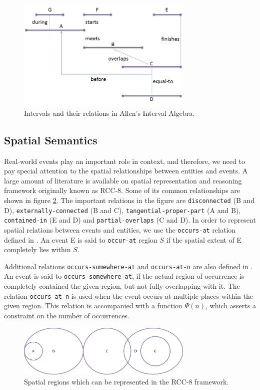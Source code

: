 \begin{figure}[t]
\centering
\includegraphics[width=0.75\textwidth]{media/chapter2/allen.png}
\caption{Intervals and their relations in Allen's Interval Algebra.}
\label{fig:allen}
\end{figure}

\subsection{Spatial Semantics}
Real-world events play an important role in context, and therefore, we need to pay special attention to the spatial relationships between entities and events. A large amount of literature is available on spatial representation and reasoning framework originally known as RCC-8. Some of its common relationships are shown in figure \ref{fig:rcc8}. The important relations in the figure are \texttt{disconnected} (B and D), \texttt{externally-connected} (B and C), \texttt{tangential-proper-part} (A and B), \texttt{contained-in} (E and D) and \texttt{partial-overlaps} (C and D). In order to represent spatial relations between events and entities, we use the \texttt{occurs-at} relation defined in \cite{gupta2011managing}. An event E is said to \texttt{occur-at} region $S$ if the spatial extent of E completely lies within $S$. 

Additional relations \texttt{occurs-somewhere-at} and \texttt{occurs-at-n} are also defined in \cite{gupta2011managing}. An event is said to \texttt{occurs-somewhere-at}, if the actual region of occurrence is completely contained the given region, but not fully overlapping with it. The relation \texttt{occurs-at-n} is used when the event occurs at multiple places within the given region. This relation is accompanied with a function $\Psi(n)$, which asserts a constraint on the number of occurrences.

\begin{figure}[h]
\centering
\includegraphics[width=0.75\textwidth]{media/chapter2/rcc8-combined.png}
\caption{Spatial regions which can be represented in the RCC-8 framework.}
\label{fig:rcc8}
\end{figure}

